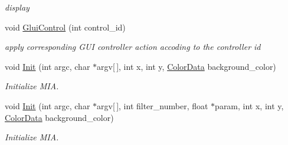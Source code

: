 \begin{DoxyCompactItemize}
\begin{DoxyCompactList}\small\item\em display \end{DoxyCompactList}\item 
void \hyperlink{classimage__tools_1_1MIAApp_a4e10cc8b814e12c16c38d4e2be3bf2bb}{Glui\+Control} (int control\+\_\+id)
\begin{DoxyCompactList}\small\item\em apply corresponding G\+UI controller action accoding to the controller id \end{DoxyCompactList}\item 
void \hyperlink{classimage__tools_1_1MIAApp_ab5bd2eb36e76c8bb81bef6c56f6bf55d}{Init} (int argc, char $\ast$argv\mbox{[}$\,$\mbox{]}, int x, int y, \hyperlink{classimage__tools_1_1ColorData}{Color\+Data} background\+\_\+color)
\begin{DoxyCompactList}\small\item\em Initialize M\+IA. \end{DoxyCompactList}\item 
void \hyperlink{classimage__tools_1_1MIAApp_a9fa2d28c3fa17fafac90f8d6fc4ebb41}{Init} (int argc, char $\ast$argv\mbox{[}$\,$\mbox{]}, int filter\+\_\+number, float $\ast$param, int x, int y, \hyperlink{classimage__tools_1_1ColorData}{Color\+Data} background\+\_\+color)
\begin{DoxyCompactList}\small\item\em Initialize M\+IA. \end{DoxyCompactList}\end{DoxyCompactItemize}
